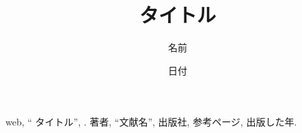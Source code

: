 \documentclass[11pt, a4paper]{jarticle}
\title{タイトル}
\author{名前}
\date{日付}
\begin{document}
\maketitle


\section{} 

\subsection{} 


\begin{thebibliography}{9}
	\bibitem{}web, “ タイトル”, \url{}.
	\bibitem{}著者, “文献名”, 出版社, 参考ページ, 出版した年.
\end{thebibliography}
\end{document}

